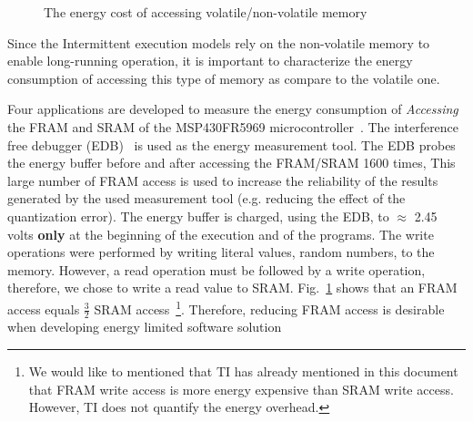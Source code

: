 \documentclass[sigconf,anonymous,review]{acmart}
\begin{document}
\begin{figure}[t]
    \centering
    \caption{The energy cost of accessing volatile/non-volatile memory}
    \label{fig:framEnergy}
\end{figure}

Since the Intermittent execution models rely on the non-volatile memory to enable long-running operation, it is important to characterize the energy consumption of accessing this type of memory as compare to the volatile one.

Four applications are developed to measure the energy consumption of \emph{Accessing} the FRAM and SRAM of the MSP430FR5969 microcontroller~\cite{xxx}. The interference free debugger (EDB)~\cite{xxx} is used as the energy measurement tool. The EDB probes the energy buffer before and after accessing the FRAM/SRAM 1600 times, This large number of FRAM access is used to increase the reliability of the results generated by the used measurement tool (e.g. reducing the effect of the quantization error).  The energy buffer is charged, using the EDB, to $\approx$ 2.45 volts \textbf{only} at the beginning of the execution and of the programs. The write operations were performed by writing literal values, random numbers, to the memory. However, a read operation must be followed by a write operation, therefore, we chose to write a read value to SRAM. Fig.~\ref{fig:framEnergy} shows that an FRAM access equals $\frac{3}{2}$ SRAM access~\footnote{We would like to mentioned that TI has already mentioned in this document~\cite{xxxx} that FRAM write access is more energy expensive than SRAM write access. However, TI does not quantify the energy overhead.}. Therefore, reducing FRAM access is desirable when developing  energy limited software solution  
\end{document}

